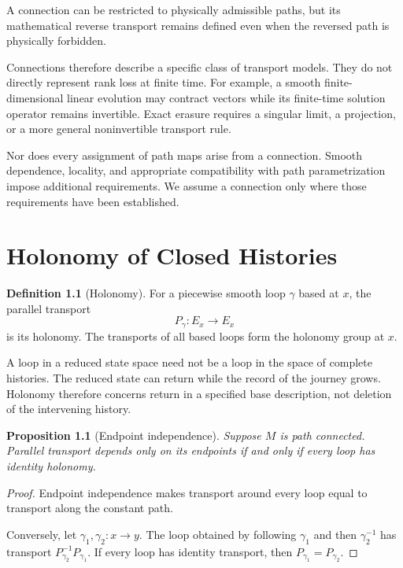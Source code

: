 \documentclass[11pt,oneside]{book}
\newtheorem{proposition}[theorem]{Proposition}
\theoremstyle{definition}
\newtheorem{definition}[theorem]{Definition}
\theoremstyle{remark}
\begin{document}
A connection can be restricted to physically admissible paths,
but its mathematical reverse transport remains defined even when
the reversed path is physically forbidden.

Connections therefore describe a specific class of transport
models. They do not directly represent rank loss at finite time.
For example, a smooth finite-dimensional linear evolution may
contract vectors while its finite-time solution operator remains
invertible. Exact erasure requires a singular limit, a projection,
or a more general noninvertible transport rule.

Nor does every assignment of path maps arise from a connection.
Smooth dependence, locality, and appropriate compatibility with
path parametrization impose additional requirements. We assume
a connection only where those requirements have been established.


\chapter{Holonomy of Closed Histories}

\begin{definition}[Holonomy]
For a piecewise smooth loop $\gamma$ based at $x$, the parallel
transport
\[
P_\gamma:E_x\longrightarrow E_x
\]
is its holonomy. The transports of all based loops form the
holonomy group at $x$.
\end{definition}

A loop in a reduced state space need not be a loop in the space
of complete histories. The reduced state can return while the
record of the journey grows. Holonomy therefore concerns return
in a specified base description, not deletion of the intervening
history.

\begin{proposition}[Endpoint independence]
Suppose $M$ is path connected. Parallel transport depends only
on its endpoints if and only if every loop has identity holonomy.
\end{proposition}

\begin{proof}
Endpoint independence makes transport around every loop equal
to transport along the constant path.

Conversely, let $\gamma_1,\gamma_2:x\to y$. The loop obtained
by following $\gamma_1$ and then $\gamma_2^{-1}$ has transport
$P_{\gamma_2}^{-1}P_{\gamma_1}$. If every loop has identity
transport, then $P_{\gamma_1}=P_{\gamma_2}$.
\end{proof}
\end{document}
